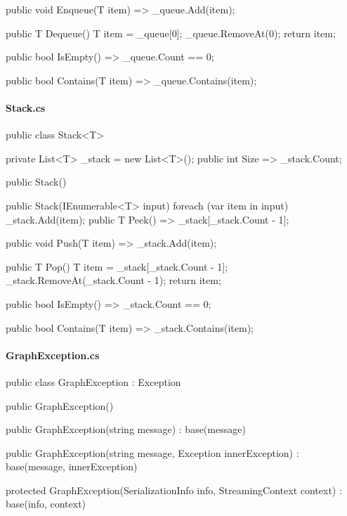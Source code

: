 \begin{flushleft}
\begin{cscode}
{    public void Enqueue(T item) => _queue.Add(item);

    public T Dequeue()
    {
        T item = _queue[0];
        _queue.RemoveAt(0);
        return item;
    }

    public bool IsEmpty() => _queue.Count == 0;

    public bool Contains(T item) => _queue.Contains(item);
}
    \end{cscode}
\pagebreak
    
    \paragraph{Stack.cs}
    \begin{cscode}
public class Stack<T>
{
    private List<T> _stack = new List<T>();
    public int Size => _stack.Count;

    public Stack() { }

    public Stack(IEnumerable<T> input)
    {
        foreach (var item in input) _stack.Add(item);
    }
    public T Peek() => _stack[_stack.Count - 1];

    public void Push(T item) => _stack.Add(item);

    public T Pop()
    {
        T item = _stack[_stack.Count - 1];
        _stack.RemoveAt(_stack.Count - 1);
        return item;
    }

    public bool IsEmpty() => _stack.Count == 0;

    public bool Contains(T item) => _stack.Contains(item);
}
    \end{cscode}
\pagebreak
    
    \paragraph{GraphException.cs}
    \begin{cscode}
[Serializable]
public class GraphException : Exception
{
    public GraphException()
    {
    }

    public GraphException(string message) : base(message)
    {
    }

    public GraphException(string message, Exception innerException) : base(message, innerException)
    {
    }

    protected GraphException(SerializationInfo info, StreamingContext context) : base(info, context)
    {
    }
}
    \end{cscode}
\pagebreak
    

\end{flushleft}
